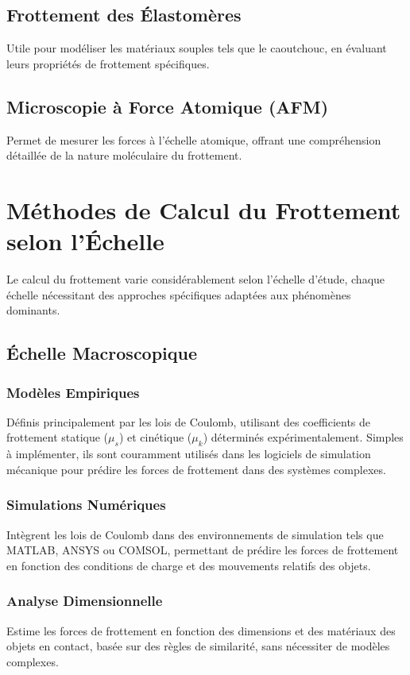 \subsection{Frottement des \'{E}lastomères}
Utile pour modéliser les matériaux souples tels que le caoutchouc, en évaluant leurs propriétés de frottement spécifiques.

\subsection{Microscopie à Force Atomique (AFM)}
Permet de mesurer les forces à l'échelle atomique, offrant une compréhension détaillée de la nature moléculaire du frottement.

\section{Méthodes de Calcul du Frottement selon l'Échelle}

Le calcul du frottement varie considérablement selon l'échelle d'étude, chaque échelle nécessitant des approches spécifiques adaptées aux phénomènes dominants.

\subsection{Échelle Macroscopique}
\label{subsec:macroscopique}

\subsubsection{Modèles Empiriques}
Définis principalement par les lois de Coulomb, utilisant des coefficients de frottement statique (\(\mu_s\)) et cinétique (\(\mu_k\)) déterminés expérimentalement. Simples à implémenter, ils sont couramment utilisés dans les logiciels de simulation mécanique pour prédire les forces de frottement dans des systèmes complexes.

\subsubsection{Simulations Numériques}
Intègrent les lois de Coulomb dans des environnements de simulation tels que MATLAB, ANSYS ou COMSOL, permettant de prédire les forces de frottement en fonction des conditions de charge et des mouvements relatifs des objets.

\subsubsection{Analyse Dimensionnelle}
Estime les forces de frottement en fonction des dimensions et des matériaux des objets en contact, basée sur des règles de similarité, sans nécessiter de modèles complexes.

